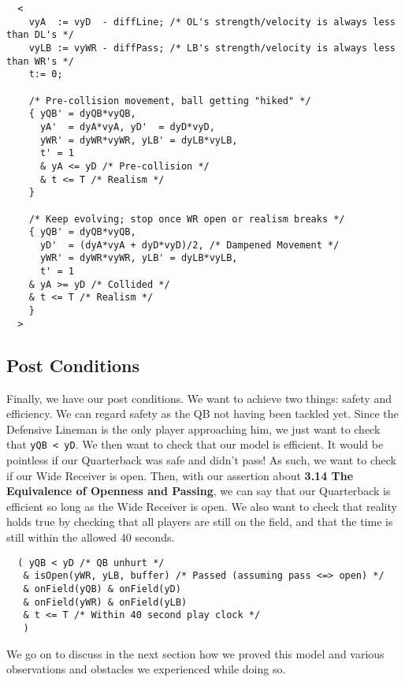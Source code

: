 \begin{lstlisting}
  <
    vyA  := vyD  - diffLine; /* OL's strength/velocity is always less than DL's */
    vyLB := vyWR - diffPass; /* LB's strength/velocity is always less than WR's */
    t:= 0;

    /* Pre-collision movement, ball getting "hiked" */
    { yQB' = dyQB*vyQB,
      yA'  = dyA*vyA, yD'  = dyD*vyD,
      yWR' = dyWR*vyWR, yLB' = dyLB*vyLB,
      t' = 1
      & yA <= yD /* Pre-collision */
      & t <= T /* Realism */
    }

    /* Keep evolving; stop once WR open or realism breaks */
    { yQB' = dyQB*vyQB,
      yD'  = (dyA*vyA + dyD*vyD)/2, /* Dampened Movement */
      yWR' = dyWR*vyWR, yLB' = dyLB*vyLB,
      t' = 1
    & yA >= yD /* Collided */
    & t <= T /* Realism */
    }
  >
\end{lstlisting}

\subsection{Post Conditions}

\quad Finally, we have our post conditions. We want to achieve two things: safety and efficiency. We can regard safety as the QB not having been tackled yet. Since the Defensive Lineman  is the only player approaching him, we just want to check that \texttt{yQB < yD}. We then want to check that our model is efficient. It would be pointless if our Quarterback was safe and didn't pass! As such, we want to check if our Wide Receiver is open. Then, with our assertion about \textbf{3.14 The Equivalence of Openness and Passing}, we can say that our Quarterback is efficient so long as the Wide Receiver is open. We also want to check that reality holds true by checking that all players are still on the field, and that the time is still within the allowed 40 seconds.

\begin{lstlisting}
  ( yQB < yD /* QB unhurt */
   & isOpen(yWR, yLB, buffer) /* Passed (assuming pass <=> open) */
   & onField(yQB) & onField(yD)
   & onField(yWR) & onField(yLB)
   & t <= T /* Within 40 second play clock */
   )
\end{lstlisting}

We go on to discuss in the next section how we proved this model and various observations and obstacles we experienced while doing so.